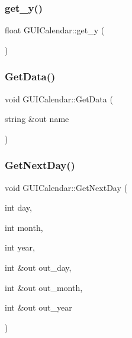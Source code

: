 \hypertarget{class_g_u_i_calendar_a9d4c8d554e880be140d918cd3448c20c}{}\label{class_g_u_i_calendar_a9d4c8d554e880be140d918cd3448c20c} 
\subsubsection{\texorpdfstring{get\+\_\+y()}{get\_y()}}
{\footnotesize\ttfamily float G\+U\+I\+Calendar\+::get\+\_\+y (\begin{DoxyParamCaption}{ }\end{DoxyParamCaption})}

\hypertarget{class_g_u_i_calendar_a7b98d82eb5905ceffa6a58110dbdf4dc}{}\label{class_g_u_i_calendar_a7b98d82eb5905ceffa6a58110dbdf4dc} 
\subsubsection{\texorpdfstring{Get\+Data()}{GetData()}}
{\footnotesize\ttfamily void G\+U\+I\+Calendar\+::\+Get\+Data (\begin{DoxyParamCaption}\item[{string \&out}]{name }\end{DoxyParamCaption})}

\hypertarget{class_g_u_i_calendar_ae8d90fea5e4d9f0fa48c495a810b83dc}{}\label{class_g_u_i_calendar_ae8d90fea5e4d9f0fa48c495a810b83dc} 
\subsubsection{\texorpdfstring{Get\+Next\+Day()}{GetNextDay()}}
{\footnotesize\ttfamily void G\+U\+I\+Calendar\+::\+Get\+Next\+Day (\begin{DoxyParamCaption}\item[{int}]{day,  }\item[{int}]{month,  }\item[{int}]{year,  }\item[{int \&out}]{out\+\_\+day,  }\item[{int \&out}]{out\+\_\+month,  }\item[{int \&out}]{out\+\_\+year }\end{DoxyParamCaption})}

